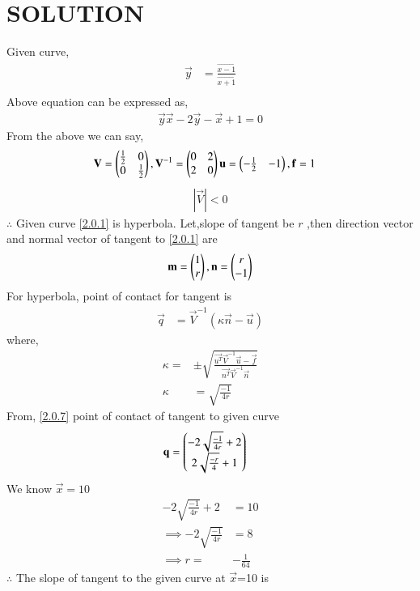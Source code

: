 \documentclass[journal,12pt,twocolumn]{IEEEtran}
\begin{document}
\section{SOLUTION}
Given curve,
\begin{align}
\vec{y}&=\frac{\vec{x-1}}{\vec{x+1}} \label{2.0.1}\\
\end{align}
Above equation can be expressed as,
\begin{align}
\vec{y}\vec{x}-2\vec{y}-\vec{x}+1 =0
\end{align}
From the above we can say,
\begin{align}
\mathbf{V}&=\begin{pmatrix}\frac{1}{2} & 0 \\ 0 & \frac{1}{2}\end{pmatrix},\mathbf{V}^{-1}=\begin{pmatrix}0&2\\2&0\end{pmatrix}\mathbf{u}=\begin{pmatrix}-\frac{1}{2}&-1\end{pmatrix},
 \mathbf{f} =1
\end{align}
\begin{align}
 |\vec{V}| < 0
\end{align}
$\therefore $ Given curve \eqref{2.0.1} is hyperbola.
Let,slope of tangent be $r$ ,then direction vector and normal vector of tangent to \eqref{2.0.1} are
\begin{align}
    \mathbf{m}= \begin{pmatrix}1\\r\end{pmatrix},\mathbf{n}=\begin{pmatrix}r\\-1\end{pmatrix} \label{2.0.6}
\end{align}
For hyperbola, point of contact for tangent is
\begin{align}
\vec{q}&=\vec{V}^{-1}(\kappa\vec{n}-\vec{u})\label{2.0.7}
\end{align}
where,
\begin{align}
\kappa=&\pm \sqrt{\frac{\vec{u^T}\vec{V}^{-1}\vec{u}-\vec{f}}{\vec{n^T}\vec{V}^{-1}\vec{n}}}\\
\kappa&=\sqrt{\frac{-1}{4r}} \label{2.0.9}
\end{align}
From, \eqref{2.0.7} point of contact of tangent to given curve
\begin{align}
\mathbf{q} &= \begin{pmatrix}-2\sqrt{\frac{-1}{4r}}+2\\2\sqrt{\frac{-r}{4}}+1\end{pmatrix}\label{2.0.10}
\end{align}
We know $\vec{x}=10$
\begin{align}
-2\sqrt{\frac{-1}{4r}}+2 &= 10\\
\implies -2\sqrt{\frac{-1}{4r}}&=8\\
\implies r=&-\frac{1}{64}
\end{align}
$\therefore$  The slope of tangent to the given curve at $\vec{x}$=10 is
\end{document}

